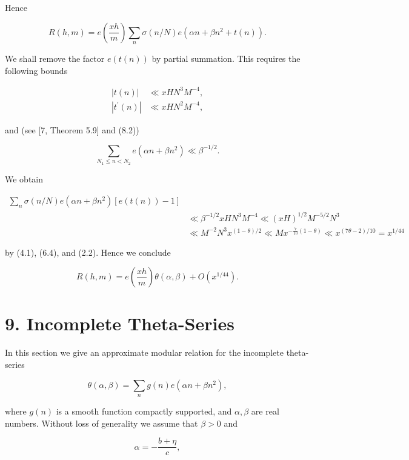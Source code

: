 \documentclass[10pt]{article}
\begin{document}
Hence

$$
R(h, m)=e\left(\frac{x h}{m}\right) \sum_{n} \sigma(n / N) e\left(\alpha n+\beta n^{2}+t(n)\right) .
$$

We shall remove the factor $e(t(n))$ by partial summation. This requires the following bounds

$$
\begin{aligned}
|t(n)| & \ll xHN^{3}M^{-4}, \\
|t^{\prime}(n)| & \ll xHN^{2}M^{-4},
\end{aligned}
$$

and (see [7, Theorem 5.9] and (8.2))

$$
\sum_{N_{1} \leqslant n<N_{2}} e\left(\alpha n+\beta n^{2}\right) \ll \beta^{-1 / 2} .
$$

We obtain

$$
\begin{aligned}
\sum_{n} \sigma(n / N) e\left(\alpha n+\beta n^{2}\right)[e(t(n))-1] & \\
& \ll \beta^{-1/2}xHN^{3}M^{-4}\ll(xH)^{1/2} M^{-5 / 2} N^{3} \\
& \ll M^{-2} N^{3} x^{(1-\theta) / 2} \ll M x^{-\frac{7}{10}(1-\theta)} \ll x^{(7 \theta-2) / 10}=x^{1 / 44}
\end{aligned}
$$

by (4.1), (6.4), and (2.2). Hence we conclude


\begin{equation*}
R(h, m)=e\left(\frac{x h}{m}\right) \theta(\alpha, \beta)+O\left(x^{1 / 44}\right) . \tag{8.4}
\end{equation*}


\section*{9. Incomplete Theta-Series}
In this section we give an approximate modular relation for the incomplete theta-series


\begin{equation*}
\theta(\alpha, \beta)=\sum_{n} g(n) e\left(\alpha n+\beta n^{2}\right), \tag{9.1}
\end{equation*}


where $g(n)$ is a smooth function compactly supported, and $\alpha, \beta$ are real numbers. Without loss of generality we assume that $\beta>0$ and


\begin{equation*}
\alpha=-\frac{b+\eta}{c}, \tag{9.2}
\end{equation*}
\end{document}
